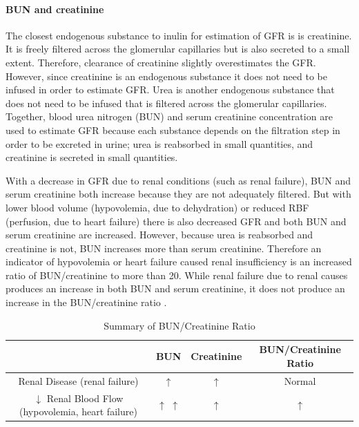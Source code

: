\paragraph{BUN and creatinine}

The closest endogenous\footnotemark{} substance to inulin for estimation of GFR is is creatinine. It is freely filtered across the glomerular capillaries but is also secreted to a small extent. Therefore, clearance of creatinine slightly overestimates the GFR. However, since creatinine is an endogenous substance it does not need to be infused in order to estimate GFR. Urea is another endogenous substance that does not need to be infused that is filtered across the glomerular capillaries. Together, blood urea nitrogen (BUN) and serum creatinine concentration are used to estimate GFR because each substance depends on the filtration step in order to be excreted in urine; urea is reabsorbed in small quantities, and creatinine is secreted in small quantities. 

With a decrease in GFR due to renal conditions (such as renal failure), BUN and serum creatinine both increase because they are not adequately filtered. But with lower blood volume (hypovolemia, due to dehydration) or reduced RBF (perfusion, due to heart failure) there is also decreased GFR and both BUN and serum creatinine are increased. However, because urea is reabsorbed and creatinine is not, BUN increases more than serum creatinine. Therefore an indicator of hypovolemia or heart failure caused renal insufficiency is an increased ratio of BUN/creatinine to more than 20. While renal failure due to renal causes produces an increase in both BUN and serum creatinine, it does not produce an increase in the BUN/creatinine ratio \cite{hall_guyton_2020}.

\begin{table}[h!]
\centering
\begin{tabular}{||c || c | c | c||} 
 \hline
  & BUN & Creatinine & BUN/Creatinine Ratio\\
 \hline\hline
 Renal Disease (renal failure) & $\uparrow$ & $\uparrow$ & Normal \\
 \hline
 $\downarrow$ Renal Blood Flow (hypovolemia, heart failure) & $\uparrow$ $\uparrow$  & $\uparrow$ & $\uparrow$ \\
 \hline
\end{tabular}
\caption{Summary of BUN/Creatinine Ratio}
\label{table:BUN_Creatinine}
\end{table}


